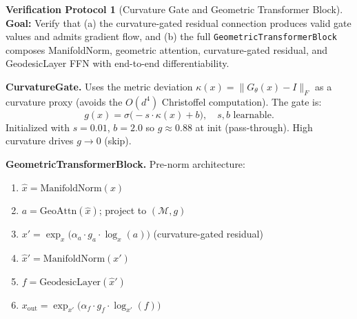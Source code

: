 \documentclass[11pt,a4paper]{article}
\theoremstyle{definition}
\newtheorem{protocol}[theorem]{Verification Protocol}
\theoremstyle{remark}
\newcommand{\Mman}{(\mathcal{M}, g)}
\begin{document}
\begin{protocol}[Curvature Gate and Geometric Transformer Block]%
\label{prot:curv_gate_block}
\textbf{Goal:} Verify that (a) the curvature-gated residual 
connection produces valid gate values and admits gradient flow, 
and (b) the full \texttt{GeometricTransformerBlock} composes 
ManifoldNorm, geometric attention, curvature-gated residual, and 
GeodesicLayer FFN with end-to-end differentiability.

\textbf{CurvatureGate.} Uses the metric deviation 
$\kappa(x) = \|G_\theta(x) - I\|_F$ as a curvature proxy 
(avoids the $O(d^4)$ Christoffel computation). The gate is:
\[
  g(x) = \sigma\!\bigl(-s\cdot\kappa(x) + b\bigr),
  \quad s, b \text{ learnable}.
\]
Initialized with $s = 0.01$, $b = 2.0$ so $g \approx 0.88$ at 
init (pass-through). High curvature drives $g\to 0$ (skip).

\textbf{GeometricTransformerBlock.} Pre-norm architecture:
\begin{enumerate}[nosep]
  \item $\hat{x} = \mathrm{ManifoldNorm}(x)$
  \item $a = \mathrm{GeoAttn}(\hat{x})$; project to $\Mman$
  \item $x' = \exp_x\!\bigl(\alpha_a \cdot g_a \cdot \log_x(a)\bigr)$ 
        \quad (curvature-gated residual)
  \item $\hat{x}' = \mathrm{ManifoldNorm}(x')$
  \item $f = \mathrm{GeodesicLayer}(\hat{x}')$
  \item $x_{\mathrm{out}} = \exp_{x'}\!\bigl(\alpha_f \cdot g_f 
        \cdot \log_{x'}(f)\bigr)$
\end{enumerate}


\end{protocol}
\end{document}
